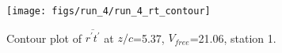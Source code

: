 \begin{figure}[H]
\centering
\texttt{[image: figs/run\_4/run\_4\_rt\_contour]}
\caption{Contour plot of $\overline{r^\prime t^\prime}$ at $z/c$=5.37, $V_{free}$=21.06, station 1.}
\label{fig:run_4_rt_contour}
\end{figure}


